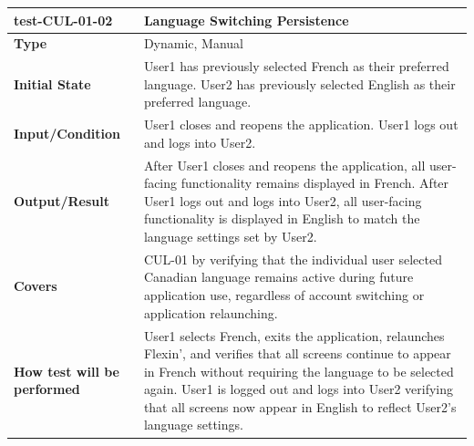 \documentclass[12pt, titlepage]{article}
\begin{document}
\vspace{1em}

\noindent\begin{tabularx}{\textwidth}{>{\raggedright\arraybackslash}p{3.5cm}X}
  \toprule
  \textbf{test-CUL-01-02} & \textbf{Language Switching Persistence}\\
  \midrule
  \textbf{Type} & Dynamic, Manual\\
  \textbf{Initial State} & User1 has previously selected French as their preferred language. User2 has previously selected English as their preferred language.\\
  \textbf{Input/Condition} & User1 closes and reopens the application. User1 logs out and logs into User2.\\
  \textbf{Output/Result} & After User1 closes and reopens the application, all user-facing functionality remains displayed in French. After User1 logs out and logs into User2, all user-facing functionality is displayed in English to match the language settings set by User2.\\
  \textbf{Covers} & CUL-01 by verifying that the individual user selected Canadian language remains active during future application use, regardless of account switching or application relaunching.\\
  \textbf{How test will be performed} & User1 selects French, exits the application, relaunches Flexin', and verifies that all screens continue to appear in French without requiring the language to be selected again. User1 is logged out and logs into User2 verifying that all screens now appear in English to reflect User2's language settings.\\
  \bottomrule
\end{tabularx}

\vspace{1em}
\end{document}
